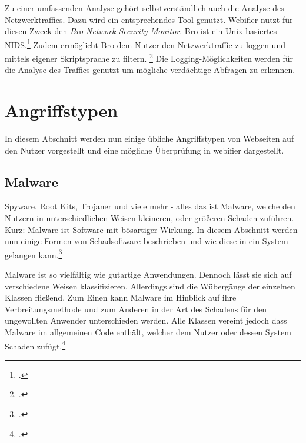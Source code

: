 Zu einer umfassenden Analyse gehört selbstverständlich auch die Analyse des Netzwerktraffics. Dazu wird ein entsprechendes Tool genutzt. Webifier nutzt für diesen Zweck den \textit{Bro Network Security Monitor}. Bro ist ein Unix-basiertes \ac{NIDS}.\footcite[Vgl.][199]{bro} Zudem ermöglicht Bro dem Nutzer den Netzwerktraffic zu loggen und mittels eigener Skriptsprache zu filtern. \footcite{bro2} Die Logging-Möglichkeiten werden für die Analyse des Traffics genutzt um mögliche verdächtige Abfragen zu erkennen.


\section{Angriffstypen}

In diesem Abschnitt werden nun einige übliche Angriffstypen von Webseiten auf den Nutzer vorgestellt und eine mögliche Überprüfung in webifier dargestellt.

\subsection{Malware}

Spyware, Root Kits, Trojaner und viele mehr - alles das ist Malware, welche den Nutzern in unterschiedlichen Weisen kleineren, oder größeren Schaden zuführen. Kurz: Malware ist Software mit bösartiger Wirkung. In diesem Abschnitt werden nun einige Formen von Schadsoftware beschrieben und wie diese in ein System gelangen kann.\footcite[Vgl.][95]{netzwerkDatensicherheit}

Malware ist so vielfältig wie gutartige Anwendungen. Dennoch lässt sie sich auf verschiedene Weisen klassifizieren. Allerdings sind die Wübergänge der einzelnen Klassen fließend. Zum Einen kann Malware im Hinblick auf ihre Verbreitungsmethode und zum Anderen in der Art des Schadens für den ungewollten Anwender unterschieden werden. Alle Klassen vereint jedoch dass Malware im allgemeinen Code enthält, welcher dem Nutzer oder dessen System Schaden zufügt.\footcite[Vgl.][95\psq]{netzwerkDatensicherheit}


